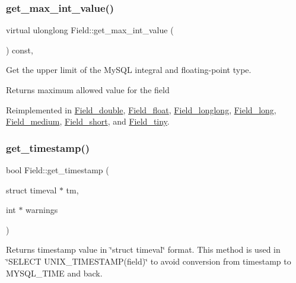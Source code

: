 \subsubsection{\texorpdfstring{get\+\_\+max\+\_\+int\+\_\+value()}{get\_max\_int\_value()}}
{\footnotesize\ttfamily virtual ulonglong Field\+::get\+\_\+max\+\_\+int\+\_\+value (\begin{DoxyParamCaption}{ }\end{DoxyParamCaption}) const\hspace{0.3cm}{\ttfamily [inline]}, {\ttfamily [virtual]}}

Get the upper limit of the My\+S\+QL integral and floating-\/point type.

\begin{DoxyReturn}{Returns}
maximum allowed value for the field 
\end{DoxyReturn}


Reimplemented in \mbox{\hyperlink{classField__double_a1b4d62698e48975973a6cd5ec77c9a6a}{Field\+\_\+double}}, \mbox{\hyperlink{classField__float_ab810f7d0ea9d35b3fdef5829195921a0}{Field\+\_\+float}}, \mbox{\hyperlink{classField__longlong_a6d530e3dbf852f37e768c8875783cc8c}{Field\+\_\+longlong}}, \mbox{\hyperlink{classField__long_aa28b8083eaced25f1c5e710af68eb44e}{Field\+\_\+long}}, \mbox{\hyperlink{classField__medium_a0b9e2f14c21e9312a9f014f24a9f95d3}{Field\+\_\+medium}}, \mbox{\hyperlink{classField__short_a96adb2b3df54346d954ee18eb2903927}{Field\+\_\+short}}, and \mbox{\hyperlink{classField__tiny_af359459fc3d3a2994dfb48f598ec553b}{Field\+\_\+tiny}}.

\mbox{\label{classField_ac6b92691afad064d5f80b762a39c0e7f}} 
\subsubsection{\texorpdfstring{get\+\_\+timestamp()}{get\_timestamp()}}
{\footnotesize\ttfamily bool Field\+::get\+\_\+timestamp (\begin{DoxyParamCaption}\item[{struct timeval $\ast$}]{tm,  }\item[{int $\ast$}]{warnings }\end{DoxyParamCaption})\hspace{0.3cm}{\ttfamily [virtual]}}

Returns timestamp value in \char`\"{}struct timeval\char`\"{} format. This method is used in \char`\"{}\+S\+E\+L\+E\+C\+T U\+N\+I\+X\+\_\+\+T\+I\+M\+E\+S\+T\+A\+M\+P(field)\char`\"{} to avoid conversion from timestamp to M\+Y\+S\+Q\+L\+\_\+\+T\+I\+ME and back. 

